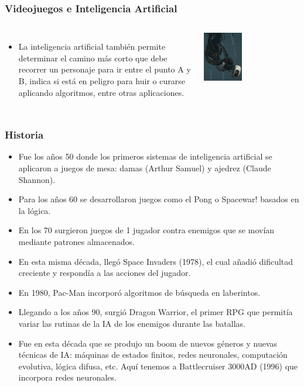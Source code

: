 \documentclass[aspectratio=169]{beamer}
\begin{document}
\begin{frame}
\frametitle{Videojuegos e Inteligencia Artificial}
\begin{columns}
\begin{itemize}[<+->]
\item La inteligencia artificial también permite determinar el camino más corto
  que debe recorrer un personaje para ir entre el punto A y B, indica si está
  en peligro para huir o curarse aplicando algoritmos, entre otras
  aplicaciones.
\end{itemize}
\begin{center}
  \includegraphics[width=0.4\textwidth]{./images/ai.jpeg}
\end{center}
\end{columns}
\end{frame}

\begin{frame}
\frametitle{Historia}
\begin{itemize}[<+->]
\item Fue los años 50 donde los primeros sistemas de inteligencia artificial se
  aplicaron a juegos de mesa: damas (Arthur Samuel) y ajedrez (Claude Shannon).
\item Para los años 60 se desarrollaron juegos como el Pong o Spacewar! basados
  en la lógica. 
\item En los 70 surgieron juegos de 1 jugador contra enemigos que se movían
  mediante patrones almacenados. 
\item En esta misma década, llegó Space Invaders (1978), el cual añadió
  dificultad creciente y respondía a las acciones del jugador.
\item En 1980, Pac-Man incorporó algoritmos de búsqueda en laberintos. 
\item Llegando a los años 90, surgió Dragon Warrior, el primer RPG que permitía
  variar las rutinas de la IA de los enemigos durante las batallas.
  \item Fue en esta década que se produjo un boom de nuevos géneros y nuevas
  técnicas de IA: máquinas de estados finitos, redes neuronales, computación
  evolutiva, lógica difusa, etc. Aquí tenemos a Battlecruiser 3000AD (1996)
  que incorpora redes neuronales.
\end{itemize}
\end{frame}
\end{document}
